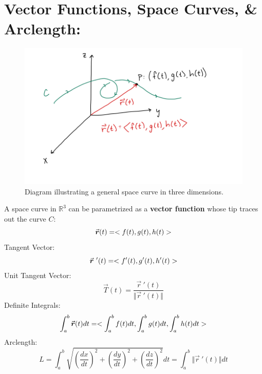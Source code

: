 \lectTitle{\vspace*{-.5in}\myTitle}{\vspace*{.1in}\mySubTitle \vspace*{-.2in}}


\setlength{\columnseprule}{0.4pt}
\setlength{\columnsep}{3em}

\section*{Vector Functions, Space Curves, \& Arclength: }
\begin{figure}[!h]
\centering
\includegraphics[width=1.1\textwidth]{Ch3-curve.png}
\caption{Diagram illustrating a general space curve in three dimensions.}
\end{figure}
\hspace*{-.3in}
A space curve in \(\mathbb{R}^3\) can be parametrized as a \textbf{vector function} whose tip traces out the curve \(C\):
\[
\vec{r}(t) = \<f(t),g(t),h(t)\>
\]
Tangent Vector:
\[
\vec{r}\ '(t) = \<f'(t),g'(t),h'(t)\>
\]
Unit Tangent Vector:
\[
\vec{T}(t) = \frac{\vec{r}\ '(t)}{\Vert\vec{r}\ '(t)\Vert} 
\]
Definite Integrals:
\[
\int_a^b \vec{r}(t) dt = \<\int_a^bf(t)dt,\int_a^bg(t)dt,\int_a^bh(t)dt\>
\]
Arclength:
\[
L =\int_a^b \sqrt{(\frac{dx}{dt})^2+(\frac{dy}{dt})^2+(\frac{dz}{dt})^2} dt = \int_a^b \Vert\vec{r}\ '(t)\Vert dt
\]



